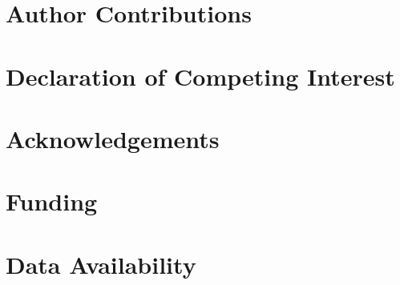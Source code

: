 \documentclass[12pt,a4paper]{article}
\newif\ifshowplaceholders
\newcommand{\outlineplaceholder}{%
\ifshowplaceholders
\par\noindent\textit{[Content to be developed.]}\par\medskip
\fi
}
\begin{document}

\section*{Author Contributions}
\outlineplaceholder

\section*{Declaration of Competing Interest}
\outlineplaceholder

\section*{Acknowledgements}
\outlineplaceholder

\section*{Funding}
\outlineplaceholder

\section*{Data Availability}
\outlineplaceholder

%
% 
% 
\end{document}
